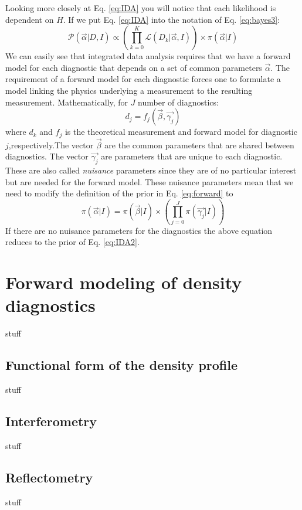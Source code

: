 \documentclass[12pt]{article}
\numberwithin{equation}{section}
\begin{document}
Looking more closely at Eq. \ref{eq:IDA} you will notice that each likelihood is dependent on $H$. 
If we put Eq. \ref{eq:IDA} into the notation of Eq. \ref{eq:bayes3}:
\begin{equation} \label{eq:IDA2}
	  {\mathcal{P}(\vec{\alpha}|D,I)} \propto {\left( \prod\limits_{k=0}^K{\mathcal{L}(D_k|\vec{\alpha},I)} \right)} \times 
	  {\pi(\vec{\alpha}|I)}
\end{equation}
We can easily see that integrated data analysis requires that we have a forward model for each diagnostic that depends on 
a set of common parameters $\vec{\alpha}$. 
The requirement of a forward model for each diagnostic forces one to formulate a model linking the physics underlying a measurement to 
the resulting measurement. Mathematically, for $J$ number of diagnostics:
\begin{equation} \label{eq:forward}
	d_j = f_j(\vec{\beta},\vec{\gamma_j})
\end{equation}
where $d_k$ and $f_j$ is the theoretical measurement and forward model for diagnostic $j$,respectively.The vector $\vec{\beta}$ are the common parameters that are shared between diagnostics. The vector $\vec{\gamma_j}$ are parameters that are unique to each diagnostic. These are also called \emph{nuisance} parameters since they are of no particular interest but are needed for the forward model. These nuisance parameters mean that we need to modify the definition of the prior in Eq. \ref{eq:forward} to 
\begin{equation} \label{eq:forwardprior}
	\pi ( \vec{\alpha} | I ) = \pi ( \vec{\beta}|I) \times \left( \prod \limits_{j=0}^{J} \pi ( \vec{\gamma_j}|I) \right)
\end{equation}
If there are no nuisance parameters for the diagnostics the above equation reduces to the prior of Eq. \ref{eq:IDA2}.
\section{Forward modeling of density diagnostics}
stuff
\subsection{Functional form of the density profile}
stuff
\subsection{Interferometry}
stuff
\subsection{Reflectometry}
stuff
\end{document}
